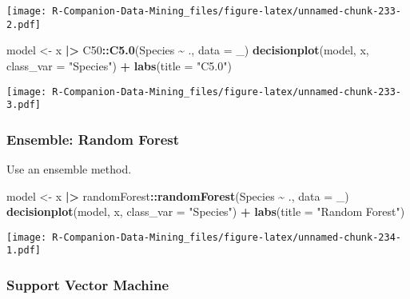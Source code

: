 \documentclass[
  notitlepage]{book}
\newenvironment{Shaded}{\begin{snugshade}}{\end{snugshade}}
\newcommand{\DataTypeTok}[1]{\textcolor[rgb]{0.13,0.29,0.53}{#1}}
\newcommand{\ErrorTok}[1]{\textcolor[rgb]{0.64,0.00,0.00}{\textbf{#1}}}
\newcommand{\KeywordTok}[1]{\textcolor[rgb]{0.13,0.29,0.53}{\textbf{#1}}}
\newcommand{\NormalTok}[1]{#1}
\newcommand{\OperatorTok}[1]{\textcolor[rgb]{0.81,0.36,0.00}{\textbf{#1}}}
\newcommand{\StringTok}[1]{\textcolor[rgb]{0.31,0.60,0.02}{#1}}
\begin{document}
\texttt{[image: R-Companion-Data-Mining\_files/figure-latex/unnamed-chunk-233-2.pdf]}

\begin{Shaded}
\begin{Highlighting}[]
\NormalTok{model \textless{}{-}}\StringTok{ }\NormalTok{x }\OperatorTok{|}\ErrorTok{\textgreater{}}\StringTok{ }\NormalTok{C50}\OperatorTok{::}\KeywordTok{C5.0}\NormalTok{(Species }\OperatorTok{\textasciitilde{}}\StringTok{ }\NormalTok{., }\DataTypeTok{data =}\NormalTok{ \_)}
\KeywordTok{decisionplot}\NormalTok{(model, x, }\DataTypeTok{class\_var =} \StringTok{"Species"}\NormalTok{) }\OperatorTok{+}\StringTok{ }
\StringTok{  }\KeywordTok{labs}\NormalTok{(}\DataTypeTok{title =} \StringTok{"C5.0"}\NormalTok{)}
\end{Highlighting}
\end{Shaded}

\texttt{[image: R-Companion-Data-Mining\_files/figure-latex/unnamed-chunk-233-3.pdf]}

\hypertarget{ensemble-random-forest}{%
\subsubsection{Ensemble: Random Forest}\label{ensemble-random-forest}}

Use an ensemble method.

\begin{Shaded}
\begin{Highlighting}[]
\NormalTok{model \textless{}{-}}\StringTok{ }\NormalTok{x }\OperatorTok{|}\ErrorTok{\textgreater{}}\StringTok{ }\NormalTok{randomForest}\OperatorTok{::}\KeywordTok{randomForest}\NormalTok{(Species }\OperatorTok{\textasciitilde{}}\StringTok{ }\NormalTok{., }\DataTypeTok{data =}\NormalTok{ \_)}
\KeywordTok{decisionplot}\NormalTok{(model, x, }\DataTypeTok{class\_var =} \StringTok{"Species"}\NormalTok{) }\OperatorTok{+}\StringTok{ }
\StringTok{  }\KeywordTok{labs}\NormalTok{(}\DataTypeTok{title =} \StringTok{"Random Forest"}\NormalTok{)}
\end{Highlighting}
\end{Shaded}

\texttt{[image: R-Companion-Data-Mining\_files/figure-latex/unnamed-chunk-234-1.pdf]}

\hypertarget{support-vector-machine}{%
\subsubsection{Support Vector Machine}\label{support-vector-machine}}
\end{document}
